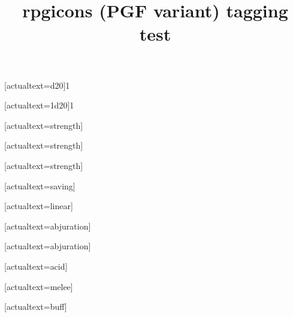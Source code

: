 \documentclass{article}
\title{rpgicons (PGF variant) tagging test}
\begin{document}
[actualtext={d20}]{1}

[actualtext={1d20}]{1}

[actualtext={strength}]

[actualtext={strength}]

[actualtext={strength}]

\saving[empty]{}[actualtext={saving}]

[actualtext={linear}]

[actualtext={abjuration}]

[actualtext={abjuration}]

[actualtext={acid}]

[actualtext={melee}]

[actualtext={buff}]

\end{document}
